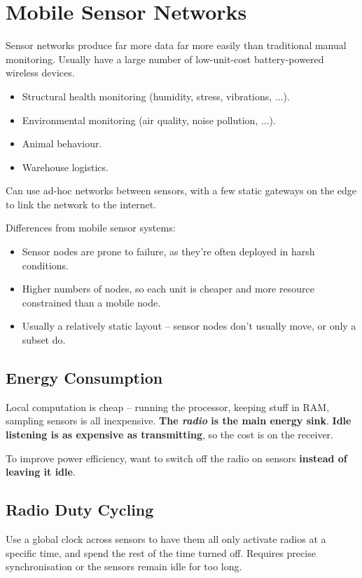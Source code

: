 \documentclass[a4paper, 11pt]{article}
\begin{document}
\section*{Mobile Sensor Networks}
{
    Sensor networks produce far more data far more easily than traditional manual monitoring. Usually have a large number of low-unit-cost battery-powered wireless devices.

    \begin{itemize}
    \item Structural health monitoring (humidity, stress, vibrations, ...).
    \item Environmental monitoring (air quality, noise pollution, ...).
    \item Animal behaviour.
    \item Warehouse logistics.
    \end{itemize}

    Can use ad-hoc networks between sensors, with a few static gateways on the edge to link the network to the internet.

    Differences from mobile sensor systems:
    \begin{itemize}
    \item Sensor nodes are prone to failure, as they're often deployed in harsh conditions.
    \item Higher numbers of nodes, so each unit is cheaper and more resource constrained than a mobile node.
    \item Usually a relatively static layout -- sensor nodes don't usually move, or only a subset do.
    \end{itemize}

    \subsection*{Energy Consumption}
    {
        Local computation is cheap -- running the processor, keeping stuff in RAM, sampling sensors is all inexpensive. \textbf{The \textit{radio} is the main energy sink}. \textbf{Idle listening is as expensive as transmitting}, so the cost is on the receiver.

        To improve power efficiency, want to switch off the radio on sensors \textbf{instead of leaving it idle}.
    }
    \subsection*{Radio Duty Cycling}
    {
        Use a global clock across sensors to have them all only activate radios at a specific time, and spend the rest of the time turned off. Requires precise synchronisation or the sensors remain idle for too long.
    }
}
\end{document}
